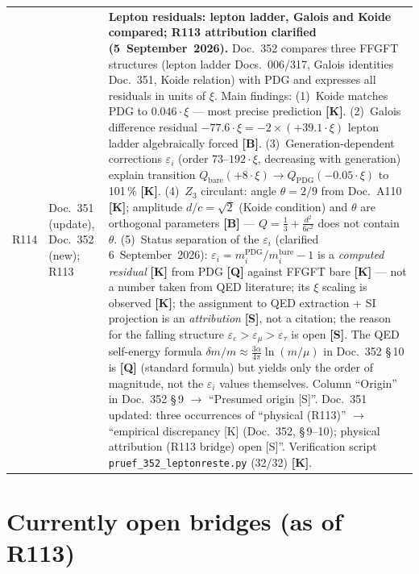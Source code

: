 \begin{longtable}{@{}p{0.9cm}p{3.1cm}p{10.2cm}@{}}
R114 & Doc.~351 (update), Doc.~352 (new); R113 & \textbf{Lepton residuals: lepton ladder, Galois and Koide compared; R113 attribution clarified \QM{} (5~September~2026).} Doc.~352 compares three FFGFT structures (lepton ladder Docs.~006/317, Galois identities Doc.~351, Koide relation) with PDG and expresses all residuals in units of $\xi$. Main findings: (1)~Koide matches PDG to $0.046\cdot\xi$ --- most precise prediction \textbf{[K]}. (2)~Galois difference residual $-77.6\cdot\xi = -2\times(+39.1\cdot\xi)$ lepton ladder algebraically forced \textbf{[B]}. (3)~Generation-dependent corrections $\varepsilon_i$ (order $73$--$192\cdot\xi$, decreasing with generation) explain transition $Q_{\mathrm{bare}}(+8\cdot\xi)\to Q_{\mathrm{PDG}}(-0.05\cdot\xi)$ to 101\,\% \textbf{[K]}. (4)~$Z_3$ circulant: angle $\theta=2/9$ from Doc.~A110 \textbf{[K]}; amplitude $d/c=\sqrt{2}$ (Koide condition) and $\theta$ are orthogonal parameters \textbf{[B]} --- $Q=\tfrac{1}{3}+\tfrac{d^2}{6c^2}$ does not contain $\theta$. (5)~Status separation of the $\varepsilon_i$ (clarified 6~September~2026): $\varepsilon_i = m_i^{\mathrm{PDG}}/m_i^{\mathrm{bare}} - 1$ is a \emph{computed residual} \textbf{[K]} from PDG \textbf{[Q]} against FFGFT bare \textbf{[K]} --- not a number taken from QED literature; its $\xi$ scaling is observed \textbf{[K]}; the assignment to QED extraction + SI projection is an \emph{attribution} \textbf{[S]}, not a citation; the reason for the falling structure $\varepsilon_e>\varepsilon_\mu>\varepsilon_\tau$ is open \textbf{[S]}. The QED self-energy formula $\delta m/m\approx\tfrac{3\alpha}{4\pi}\ln(m/\mu)$ in Doc.~352 §\,10 is \textbf{[Q]} (standard formula) but yields only the order of magnitude, not the $\varepsilon_i$ values themselves. Column ``Origin'' in Doc.~352 §\,9 $\to$ ``Presumed origin [S]''. Doc.~351 updated: three occurrences of ``physical (R113)'' $\to$ ``empirical discrepancy [K] (Doc.~352, §\,9--10); physical attribution (R113 bridge) open [S]''. Verification script \texttt{pruef\_352\_leptonreste.py} (32/32) \textbf{[K]}. \\
\end{longtable}
\endgroup

\section{Currently open bridges (as of R113)}

